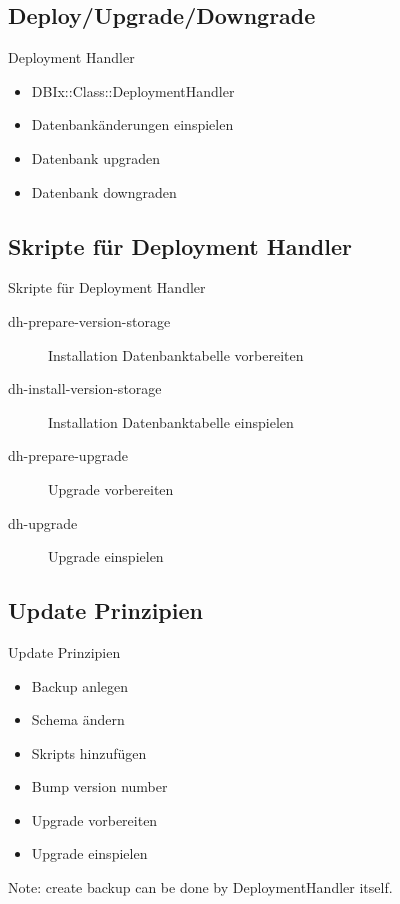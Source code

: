 \subsection{Deploy/Upgrade/Downgrade}

\begin{frame}{Deployment Handler}
\begin{itemize}
\item DBIx::Class::DeploymentHandler
\item Datenbankänderungen einspielen
\item Datenbank upgraden
\item Datenbank downgraden
\end{itemize}
\end{frame}

\subsection{Skripte für Deployment Handler}
\begin{frame}{Skripte für Deployment Handler}
\begin{description}
\item[dh-prepare-version-storage] Installation Datenbanktabelle vorbereiten
\item[dh-install-version-storage] Installation Datenbanktabelle einspielen
\item[dh-prepare-upgrade] Upgrade vorbereiten
\item[dh-upgrade] Upgrade einspielen
\end{description}
\end{frame}

\subsection{Update Prinzipien}

\begin{frame}{Update Prinzipien}
\begin{itemize}
\item Backup anlegen
\item Schema ändern
\item Skripts hinzufügen
\item Bump version number
\item Upgrade vorbereiten
\item Upgrade einspielen
\end{itemize}
\end{frame}

Note: create backup can be done by DeploymentHandler itself.

